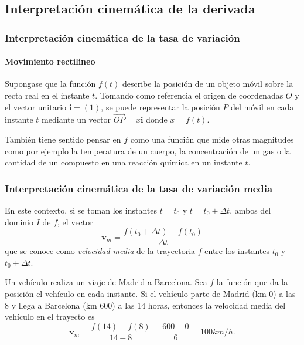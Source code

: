 \subsection{Interpretación cinemática de la derivada}
\begin{frame}
\frametitle{Interpretación cinemática de la tasa de variación}
\framesubtitle{Movimiento rectilineo}
Supongase que la función $f(t)$ describe la posición de un objeto móvil sobre la recta real en el instante $t$.
Tomando como referencia el origen de coordenadas $O$ y el vector unitario $\mathbf{i}=(1)$, se puede representar la
posición $P$ del móvil en cada instante $t$ mediante un vector $\vec{OP}=x\mathbf{i}$ donde $x=f(t)$.
\begin{center}
\scalebox{1}{}
\end{center}

También tiene sentido pensar en $f$ como una función que mide otras magnitudes como por ejemplo la temperatura de un
cuerpo, la concentración de un gas o la cantidad de un compuesto en una reacción química en un instante $t$.
\end{frame}


\begin{frame}
\frametitle{Interpretación cinemática de la tasa de variación media}
En este contexto, si se toman los instantes $t=t_0$ y $t=t_0+\Delta t$, ambos del dominio $I$ de $f$, el vector
\[
\mathbf{v}_m=\frac{f(t_0+\Delta t)-f(t_0)}{\Delta t}
\]
que se conoce como \emph{velocidad media} de la trayectoria $f$ entre los instantes $t_0$ y $t_0+\Delta t$. 

Un vehículo realiza un viaje de Madrid a Barcelona.
Sea $f$ la función que da la posición el vehículo en cada instante.
Si el vehículo parte de Madrid (km 0) a las 8 y llega a Barcelona (km 600) a las 14 horas, entonces la velocidad media
del vehículo en el trayecto es 
\[ 
\mathbf{v}_m=\frac{f(14)-f(8)}{14-8}=\frac{600-0}{6} = 100 km/h. 
\]
\end{frame}


